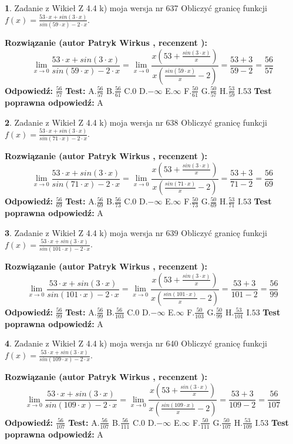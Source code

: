 \documentclass[12pt, a4paper]{article}
\theoremstyle{definition} %
\newtheorem{zad}{}
\newcommand{\zadStart}[1]{\begin{zad}#1\newline}
\newcommand{\zadStop}{\end{zad}}
\newcommand{\rozwStart}[2]{\noindent \textbf{Rozwiązanie (autor #1 , recenzent #2): }\newline}
\newcommand{\rozwStop}{\newline}
\newcommand{\odpStart}{\noindent \textbf{Odpowiedź:}\newline}
\newcommand{\odpStop}{\newline}
\newcommand{\testStart}{\noindent \textbf{Test:}\newline}
\newcommand{\testStop}{\newline}
\newcommand{\kluczStart}{\noindent \textbf{Test poprawna odpowiedź:}\newline}
\newcommand{\kluczStop}{\newline}
\begin{document}
\zadStart{Zadanie z Wikieł Z 4.4 k) moja wersja nr 637}
Obliczyć granicę funkcji $f(x)=\frac{53\cdot x +sin(3\cdot x)}{sin(59\cdot x) -2\cdot x}$.
\zadStop
\rozwStart{Patryk Wirkus}{}
$$\lim\limits_{x\to 0}\frac{53\cdot x +sin(3\cdot x)}{sin(59\cdot x) -2\cdot x}
=\lim\limits_{x\to 0}\frac{x(53+\frac{sin(3\cdot x)}{x})}{x(\frac{sin(59\cdot x)}{x}-2)}
=\frac{53+3}{59-2} = \frac{56}{57}$$
\rozwStop
\odpStart
$\frac{56}{57}$
\odpStop
\testStart
A.$\frac{56}{57}$
B.$\frac{56}{61}$
C.$0$
D.$-\infty$
E.$\infty$
F.$\frac{50}{61}$
G.$\frac{50}{57}$
H.$\frac{53}{59}$
I.$53$
\testStop
\kluczStart
A
\kluczStop



\zadStart{Zadanie z Wikieł Z 4.4 k) moja wersja nr 638}
Obliczyć granicę funkcji $f(x)=\frac{53\cdot x +sin(3\cdot x)}{sin(71\cdot x) -2\cdot x}$.
\zadStop
\rozwStart{Patryk Wirkus}{}
$$\lim\limits_{x\to 0}\frac{53\cdot x +sin(3\cdot x)}{sin(71\cdot x) -2\cdot x}
=\lim\limits_{x\to 0}\frac{x(53+\frac{sin(3\cdot x)}{x})}{x(\frac{sin(71\cdot x)}{x}-2)}
=\frac{53+3}{71-2} = \frac{56}{69}$$
\rozwStop
\odpStart
$\frac{56}{69}$
\odpStop
\testStart
A.$\frac{56}{69}$
B.$\frac{56}{73}$
C.$0$
D.$-\infty$
E.$\infty$
F.$\frac{50}{73}$
G.$\frac{50}{69}$
H.$\frac{53}{71}$
I.$53$
\testStop
\kluczStart
A
\kluczStop



\zadStart{Zadanie z Wikieł Z 4.4 k) moja wersja nr 639}
Obliczyć granicę funkcji $f(x)=\frac{53\cdot x +sin(3\cdot x)}{sin(101\cdot x) -2\cdot x}$.
\zadStop
\rozwStart{Patryk Wirkus}{}
$$\lim\limits_{x\to 0}\frac{53\cdot x +sin(3\cdot x)}{sin(101\cdot x) -2\cdot x}
=\lim\limits_{x\to 0}\frac{x(53+\frac{sin(3\cdot x)}{x})}{x(\frac{sin(101\cdot x)}{x}-2)}
=\frac{53+3}{101-2} = \frac{56}{99}$$
\rozwStop
\odpStart
$\frac{56}{99}$
\odpStop
\testStart
A.$\frac{56}{99}$
B.$\frac{56}{103}$
C.$0$
D.$-\infty$
E.$\infty$
F.$\frac{50}{103}$
G.$\frac{50}{99}$
H.$\frac{53}{101}$
I.$53$
\testStop
\kluczStart
A
\kluczStop



\zadStart{Zadanie z Wikieł Z 4.4 k) moja wersja nr 640}
Obliczyć granicę funkcji $f(x)=\frac{53\cdot x +sin(3\cdot x)}{sin(109\cdot x) -2\cdot x}$.
\zadStop
\rozwStart{Patryk Wirkus}{}
$$\lim\limits_{x\to 0}\frac{53\cdot x +sin(3\cdot x)}{sin(109\cdot x) -2\cdot x}
=\lim\limits_{x\to 0}\frac{x(53+\frac{sin(3\cdot x)}{x})}{x(\frac{sin(109\cdot x)}{x}-2)}
=\frac{53+3}{109-2} = \frac{56}{107}$$
\rozwStop
\odpStart
$\frac{56}{107}$
\odpStop
\testStart
A.$\frac{56}{107}$
B.$\frac{56}{111}$
C.$0$
D.$-\infty$
E.$\infty$
F.$\frac{50}{111}$
G.$\frac{50}{107}$
H.$\frac{53}{109}$
I.$53$
\testStop
\kluczStart
A
\kluczStop
\end{document}
